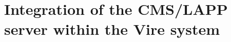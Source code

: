

\section{Integration of the CMS/LAPP server within the Vire system}\label{sec:cmslapp_server}

















